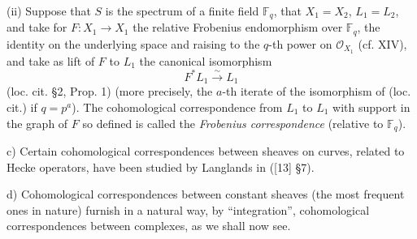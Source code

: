\documentclass[11pt]{article}
\begin{document}
(ii) Suppose that $S$ is the spectrum of a finite field $\mathbb F_q$, that $X_1=X_2$, $L_1=L_2$, and take for $F:X_1\to X_1$ the relative Frobenius endomorphism over $\mathbb F_q$, the identity on the underlying space and raising to the $q$-th power on $\mathcal O_{X_1}$ (cf. XIV), and take as lift of $F$ to $L_1$ the canonical isomorphism
\[
F^*L_1\xrightarrow{\sim}L_1
\]
(loc. cit. §2, Prop. 1) (more precisely, the $a$-th iterate of the isomorphism of (loc. cit.) if $q=p^a$). The cohomological correspondence from $L_1$ to $L_1$ with support in the graph of $F$ so defined is called the \emph{Frobenius correspondence} (relative to $\mathbb F_q$).

c) Certain cohomological correspondences between sheaves on curves, related to Hecke operators, have been studied by Langlands in ([13] §7).

d) Cohomological correspondences between constant sheaves (the most frequent ones in nature) furnish in a natural way, by ``integration'', cohomological correspondences between complexes, as we shall now see.
\end{document}
